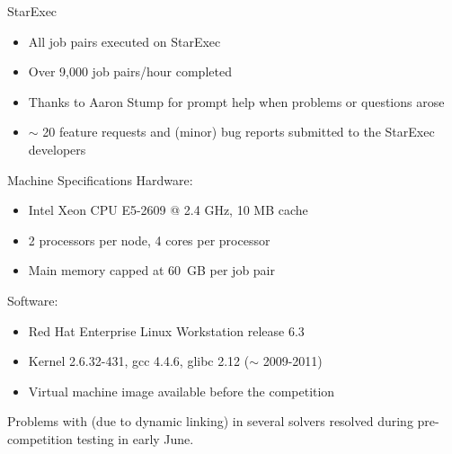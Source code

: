 \documentclass{beamer}
\begin{document}

\begin{frame}{StarExec}
  \begin{itemize}
  \item All job pairs executed on StarExec
  \item Over 9,000 job pairs/hour completed
  \end{itemize}

  \medskip

  \begin{center}
    {\Large{}}
  \end{center}

  \medskip

  \begin{itemize}
  \item Thanks to Aaron Stump for prompt help when problems or
    questions arose
  \item $\sim$ 20 feature requests and (minor) bug reports submitted
    to the StarExec developers
  \end{itemize}
\end{frame}


\begin{frame}{Machine Specifications}
  Hardware:
  \begin{itemize}
  \item Intel Xeon CPU E5-2609 @ 2.4 GHz, 10 MB cache
  \item 2 processors per node, 4 cores per processor
  \item Main memory capped at 60~GB per job pair
  \end{itemize}

  \medskip

  Software:
  \begin{itemize}
  \item Red Hat Enterprise Linux Workstation release 6.3
  \item Kernel 2.6.32-431, gcc 4.4.6, glibc 2.12 ($\sim$ 2009-2011)
  \item Virtual machine image available before the competition
  \end{itemize}

  \bigskip

  Problems with  (due to dynamic linking)
  in several solvers resolved during pre-competition testing in early
  June.
\end{frame}
\end{document}
